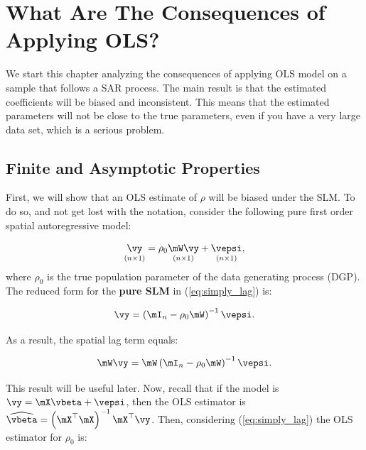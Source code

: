 \documentclass[english,12pt]{book}\usepackage[]{graphicx}\usepackage[]{xcolor}
\begin{document}


\section{What Are The Consequences of Applying OLS?}\label{sec:consequences_slm}

We start this chapter analyzing the consequences of applying OLS model on a sample that follows a SAR process. The main result is that the estimated coefficients will be biased and inconsistent. This means that the estimated parameters will not be close to the true parameters, even if you have a very large data set, which is a serious problem.

\subsection{Finite and Asymptotic Properties}

First, we will show that an OLS estimate of $\rho$ will be biased under the SLM. To do so, and not get lost with the notation, consider the following pure first order spatial autoregressive model:

\begin{equation}\label{eq:simply_lag}
\underset{(n\times 1)}{\vy} = \rho_0\underset{(n\times 1)}{\mW\vy} + \underset{(n\times 1)}{\vepsi},
\end{equation}
%
where $\rho_0$ is the true population parameter of the data generating process (DGP). The reduced form for the \textbf{pure SLM} in (\ref{eq:simply_lag}) is:

\begin{equation}\label{eq:reduced_form_pure_slm}
\vy =\left(\mI_n - \rho_0\mW\right)^{-1}\vepsi.
\end{equation}

As a result, the spatial lag term equals:

\begin{equation}\label{eq:wy_pure}
  \mW\vy = \mW\left(\mI_n - \rho_0\mW\right)^{-1}\vepsi.
\end{equation}

This result will be useful later. Now, recall that if the model is $\vy = \mX\vbeta + \vepsi$, then the OLS estimator is $\widehat{\vbeta} = \left(\mX^\top\mX\right)^{-1}\mX^\top\vy$. Then, considering (\ref{eq:simply_lag}) the OLS estimator for $\rho_0$ is: 
\end{document}
